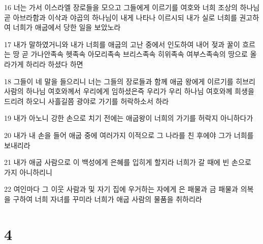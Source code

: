 \par 16 너는 가서 이스라엘 장로들을 모으고 그들에게 이르기를 여호와 너희 조상의 하나님 곧 아브라함과 이삭과 야곱의 하나님이 내게 나타나 이르시되 내가 실로 너희를 권고하여 너희가 애굽에서 당한 일을 보았노라
\par 17 내가 말하였거니와 내가 너희를 애굽의 고난 중에서 인도하여 내어 젖과 꿀이 흐르는 땅 곧 가나안족속 헷족속 아모리족속 브리스족속 히위족속 여부스족속의 땅으로 올라가게 하리라 하셨다 하면
\par 18 그들이 네 말을 들으리니 너는 그들의 장로들과 함께 애굽 왕에게 이르기를 히브리 사람의 하나님 여호와께서 우리에게 임하셨은즉 우리가 우리 하나님 여호와께 희생을 드리려 하오니 사흘길쯤 광야로 가기를 허락하소서 하라
\par 19 내가 아노니 강한 손으로 치기 전에는 애굽왕이 너희의 가기를 허락지 아니하다가
\par 20 내가 내 손을 들어 애굽 중에 여러가지 이적으로 그 나라를 친 후에야 그가 너희를 보내리라
\par 21 내가 애굽 사람으로 이 백성에게 은혜를 입히게 할지라 너희가 갈 때에 빈 손으로 가지 아니하리니
\par 22 여인마다 그 이웃 사람과 및 자기 집에 우거하는 자에게 은 패물과 금 패물과 의복을 구하여 너희 자녀를 꾸미라 너희가 애굽 사람의 물품을 취하리라

\chapter{4}

